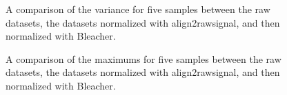 \documentclass[a4paper]{article}
\begin{document}
  \begin{figure}[htp]
    \caption{A comparison of the variance for five samples between the raw datasets, the datasets normalized with align2rawsignal, and then normalized with Bleacher.}
    \label{fig:5}
  \end{figure}

  \begin{figure}[htp]
    \caption{A comparison of the maximums for five samples between the raw datasets, the datasets normalized with align2rawsignal, and then normalized with Bleacher.}
    \label{fig:6}
  \end{figure}
\end{document}
